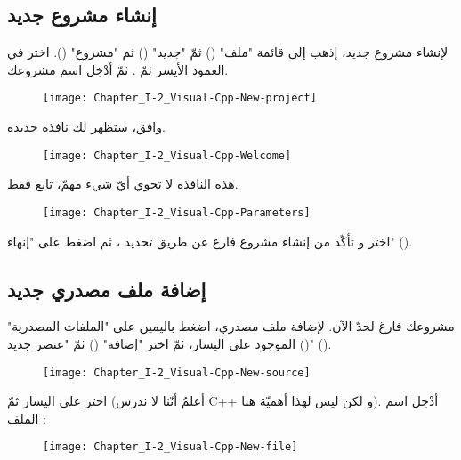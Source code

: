 \subsection{إنشاء مشروع جديد}

لإنشاء مشروع جديد، إذهب إلى قائمة
"ملف"
()
ثمّ
"جديد"
()
ثم
"مشروع"
().
اختر
في العمود الأيسر ثمّ
.
ثمّ أدْخِل اسم مشروعك.

\begin{figure}[H]
	\centering
	\texttt{[image: Chapter\_I-2\_Visual-Cpp-New-project]}
\end{figure}

وافق، ستظهر لك نافذة جديدة.

\begin{figure}[H]
	\centering
	\texttt{[image: Chapter\_I-2\_Visual-Cpp-Welcome]}
\end{figure}

هذه النافذة لا تحوي أيّ شيء مهمّ، تابع فقط.

\begin{figure}[H]
	\centering
	\texttt{[image: Chapter\_I-2\_Visual-Cpp-Parameters]}
\end{figure}

اختر
و تأكّد من إنشاء مشروع فارغ عن طريق تحديد
،
ثم اضغط على
"إنهاء"
().

\subsection{إضافة ملف مصدري جديد}

مشروعك فارغ لحدّ الآن. لإضافة ملف مصدري، اضغط باليمين على
"الملفات المصدرية"
()
الموجود على اليسار، ثمّ اختر
"إضافة"
()
ثمّ
"عنصر جديد"
().

\begin{figure}[H]
	\centering
	\texttt{[image: Chapter\_I-2\_Visual-Cpp-New-source]}
\end{figure}

اختر
على اليسار ثمّ
(أعلمُ أنّنا لا ندرس
\textenglish{C++}
و لكن ليس لهذا أهميّة هنا). أدْخِل اسم الملف :

\begin{figure}[H]
	\centering
	\texttt{[image: Chapter\_I-2\_Visual-Cpp-New-file]}
\end{figure}


